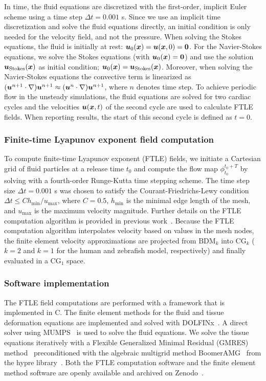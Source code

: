 \documentclass{template}
\begin{document}
In time, the fluid equations are discretized with the first-order, implicit
Euler scheme using a time step $\Delta t = 0.001$ s.
Since we use an implicit time discretization and solve the fluid equations
directly, an initial condition is only needed
for the velocity field, and not the pressure.
When solving the Stokes equations, the fluid is 
initially at rest: $\bm{u}_0(\bm{x})=\bm{u}(\bm{x}, 0)=\bm{0}$.
For the Navier-Stokes equations, we solve the Stokes equations
(with $\bm{u}_0(\bm{x})=\bm{0}$) and use the solution
$\bm{u}_{\mathrm{Stokes}}(\bm{x})$ as initial condition;
$\bm{u}_0(\bm{x})=\bm{u}_{\mathrm{Stokes}}(\bm{x})$. 
Moreover, when solving the Navier-Stokes equations the convective term
is linearized as $(\bm{u}^{n+1}\cdot\nabla)\bm{u}^{n+1} \approx (\bm{u}^n\cdot\nabla)\bm{u}^{n+1}$,
where $n$ denotes time step.
To achieve periodic flow in the unsteady simulations, the fluid equations
are solved for two cardiac cycles and the velocities $\bm{u}(\bm{x}, t)$
of the second cycle are used to calculate FTLE fields.
When reporting results, the start of this second cycle is defined as $t=0$.

\subsubsection{Finite-time Lyapunov exponent field computation}
To compute finite-time Lyapunov exponent (FTLE) fields,
we initiate a Cartesian grid of fluid particles at a release
time $t_0$ and compute the flow map $\phi_{t_0}^{t_0+T}$
by solving  with a fourth-order Runge-Kutta 
time stepping scheme. The time step size $\Delta t = 0.001$ s
was chosen to satisfy the Courant-Friedrichs-Lewy condition
$\Delta t \leq C h_{\mathrm{min}}/u_{\mathrm{max}}$,
where $C=0.5$, $h_{\mathrm{min}}$ is the minimal edge length
of the mesh, and $u_{\mathrm{max}}$ is
the maximum velocity magnitude. Further details on the
FTLE computation algorithm is provided in previous work~\citep{shadden2010computational}.
Because the FTLE computation algorithm interpolates velocity
based on values in the mesh nodes, the finite element velocity
approximations are projected from $\mathrm{BDM}_k$ into
$\mathrm{CG}_k$ ($k=2$ and $k=1$ for the human and zebrafish model, respectively)
and finally evaluated in a $\mathrm{CG}_1$ space.

\subsubsection{Software implementation}
The FTLE field computations are performed with a 
framework that is implemented in C.
The finite element methods for the fluid and tissue deformation equations
are implemented and solved with DOLFINx~\citep{baratta2023dolfinx}.
A direct solver using MUMPS~\citep{Amestoy2011Mumps} is used to solve the fluid equations.
We solve the tissue equations iteratively with a
Flexible Generalized Minimal Residual (GMRES) method~\citep{fgmres} 
preconditioned with the algebraic multigrid method
BoomerAMG~\citep{yang2002boomeramg} from the hypre library~\citep{hypre}. 
Both the FTLE computation software and the finite element method software
are openly available and archived on Zenodo~\citep{zenodoArchive}.
\end{document}
